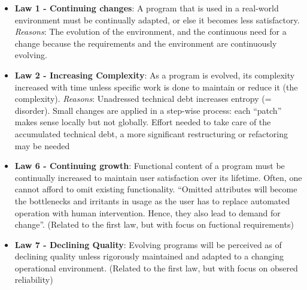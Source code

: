 \begin{itemize}
\item \textbf{Law 1 - Continuing changes}: A program that is used in a real-world environment must be continually adapted, or else it becomes less satisfactory. \textit{Reasons}: The evolution of the environment, and the continuous need for a change because the requirements and the environment are continuously evolving.
\item \textbf{Law 2 - Increasing Complexity}: As a program is evolved, its complexity increased with time unless specific work is done to maintain or reduce it (the complexity). \textit{Reasons}: Unadressed technical debt increases entropy (= disorder). Small changes are applied in a step-wise process: each \enquote{patch} makes sense locally but not globally. Effort needed to take care of the accumulated technical debt, a more significant restructuring or refactoring may be needed
\item \textbf{Law 6 - Continuing growth}: Functional content of a program must be continually increased to maintain user satisfaction over its lifetime.  Often, one cannot afford to omit existing functionality. \enquote{Omitted attributes will become the bottlenecks and irritants in usage as the user has to replace automated operation with human intervention. Hence, they also lead to demand for change}. (Related to the first law, but with focus on fuctional requirements)
\item \textbf{Law 7 - Declining Quality}: Evolving programs will be perceived as of declining quality unless rigorously maintained and adapted to a changing operational environment. (Related to the first law, but with focus on obsered reliability)
\end{itemize}
